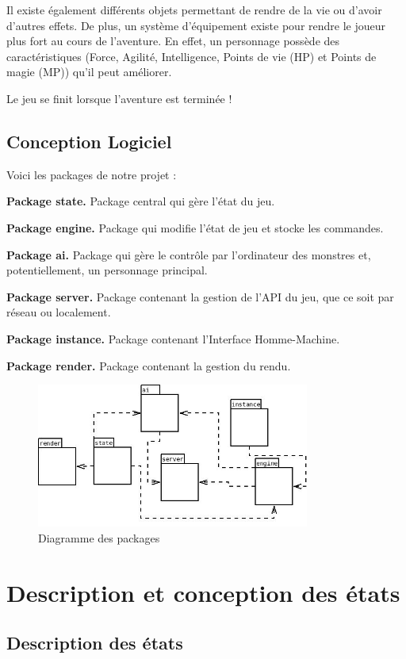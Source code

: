 \documentclass[12pt,a4paper]{report}
\begin{document}
Il existe \'{e}galement diff\'{e}rents objets permettant de rendre de la vie ou d'avoir d'autres effets. De plus, un syst\`{e}me d'\'{e}quipement existe pour rendre le joueur plus fort au cours de l'aventure. En effet, un personnage poss\`{e}de des caract\'{e}ristiques (Force, Agilit\'{e}, Intelligence, Points de vie (HP) et Points de magie (MP)) qu'il peut am\'{e}liorer.

Le jeu se finit lorsque l'aventure est termin\'{e}e !
\section{Conception Logiciel}

Voici les packages de notre projet :

\textbf{Package state.} Package central qui g\`{e}re l'\'{e}tat du jeu.

\textbf{Package engine.} Package qui modifie l'\'{e}tat de jeu et stocke les commandes.

\textbf{Package ai.} Package qui g\`{e}re le contrôle par l'ordinateur des monstres et, potentiellement, un personnage principal.

\textbf{Package server.} Package contenant la gestion de l'API du jeu, que ce soit par r\'{e}seau ou localement.

\textbf{Package instance.} Package contenant l'Interface Homme-Machine.

\textbf{Package render.} Package contenant la gestion du rendu.

\begin{figure}
\caption{Diagramme des packages}
\includegraphics[width=0.80\textwidth]{packdia.jpeg}
\end{figure}

\chapter{Description et conception des \'{e}tats}
\section{Description des \'{e}tats}
\end{document}
